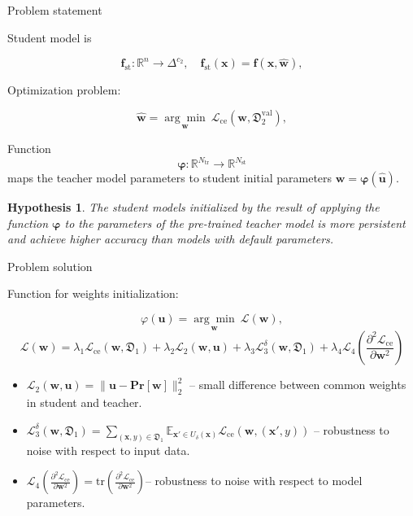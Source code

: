 \documentclass[dvipsnames,aspectratio=169]{beamer}
\begin{document}
\begin{frame}{Problem statement}

    Student model is

    \[\mathbf{f}_\text{st}: \mathbb{R}^{n} \rightarrow \Delta^{c_2},\quad \mathbf{f}_\text{st}(\mathbf{x}) = \mathbf{f}(\mathbf{x}, \hat{\mathbf{w}}),\]

    Optimization problem:

    
    \[\hat{\mathbf{w}} =  \underset{\mathbf{w}}{\arg\min}~\mathcal{L}_\text{ce}(\mathbf{w}, \mathfrak{D}^\text{val}_2),\]

    Function
    \[\boldsymbol{\varphi}: \mathbb{R}^{N_\text{tr}} \rightarrow \mathbb{R}^{N_\text{st}}\] 
    maps the teacher model parameters to student initial parameters $\mathbf{w} = \boldsymbol{\varphi}(\hat{\mathbf{u}})$.

    \newtheorem{hypothesis}{Hypothesis}
    \begin{hypothesis}
    The student models initialized by the result of applying the function $\boldsymbol{\varphi}$ to the parameters of the pre-trained teacher model is more persistent and achieve higher accuracy than models with default parameters.
    \end{hypothesis}

\end{frame}



\begin{frame}{Problem solution}
    
    Function for weights initialization:
    
    $$\varphi(\mathbf{u}) = \underset{\mathbf{w}}{\arg\min}~\mathcal{L}(\mathbf{w}),$$
 \[\mathcal{L}(\mathbf{w}) = \lambda_1 \mathcal{L}_\text{ce}(\mathbf{w}, \mathfrak{D}_1) + \lambda_2 \mathcal{L}_2 (\mathbf{w}, \mathbf{u}) + \lambda_3 \mathcal{L}_3^\delta (\mathbf{w}, \mathfrak{D}_1) + \lambda_4 \mathcal{L}_4 \left(\displaystyle \frac{\partial^2 \mathcal{L}_\text{ce}}{\partial \mathbf{w}^2}\right)\]

    \begin{itemize}
        \item $\mathcal{L}_2 (\mathbf{w}, \mathbf{u}) = \|\textbf{u} - \textbf{Pr}[\textbf{w}]\|^2_2$  -- small difference between common weights in student and teacher.
        \item $\mathcal{L}_3^\delta (\mathbf{w}, \mathfrak{D}_1) = \displaystyle \sum \limits_{(\textbf{x}, y) \in \mathfrak{D}_1} \displaystyle \mathbb{E}_{\textbf{x}' \in U_\delta(\textbf{x})} \mathcal{L}_\text{ce}(\mathbf{w}, (\textbf{x}', y))$ -- robustness to noise with respect to input data.
        \item $\mathcal{L}_4 \left(\displaystyle \frac{\partial^2 \mathcal{L}_\text{ce}}{\partial \mathbf{w}^2}\right) = \text{tr} \left(\displaystyle \frac{\partial^2 \mathcal{L}_\text{ce}}{\partial \mathbf{w}^2}\right) $-- robustness to noise with respect to model parameters.
    \end{itemize}

\end{frame}
\end{document}
